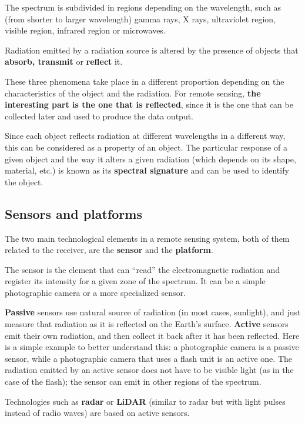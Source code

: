 The spectrum is subdivided in regions depending on the wavelength, such as (from shorter to larger wavelength) gamma rays, X rays, ultraviolet region, visible region, infrared region or microwaves.


Radiation emitted by a radiation source is altered by the presence of objects that \textbf{absorb, transmit} or \textbf{reflect} it.

These three phenomena take place in a different proportion depending on the characteristics of the object and the radiation. For remote sensing, \textbf{the interesting part is the one that is reflected}, since it is the one that can be collected later and used to produce the data output.

Since each object reflects radiation at different wavelengths in a different way, this can be considered as a property of an object. The particular response of a given object and the way it alters a given radiation (which depends on its shape, material, etc.) is known as its \textbf{spectral signature} and can be used to identify the object.


\subsection{Sensors and platforms}

The two main technological elements in a remote sensing system, both of them related to the receiver, are the \textbf{sensor} and the \textbf{platform}.

The sensor is the element that can ``read'' the electromagnetic radiation and register its intensity for a given zone of the spectrum. It can be a simple photographic camera or a more specialized sensor.

\textbf{Passive} sensors use natural source of radiation (in most cases, sunlight), and just measure that radiation as it is reflected on the Earth's surface. \textbf{Active} sensors emit their own radiation, and then collect it back after it has been reflected. Here is a simple example to better understand this: a photographic camera is a passive sensor, while a photographic camera that uses a flash unit is an active one. The radiation emitted by an active sensor does not have to be visible light (as in the case of the flash); the sensor can emit in other regions of the spectrum.

Technologies such as \textbf{radar} or \textbf{LiDAR} (similar to radar but with light pulses instead of radio waves) are based on active sensors.

